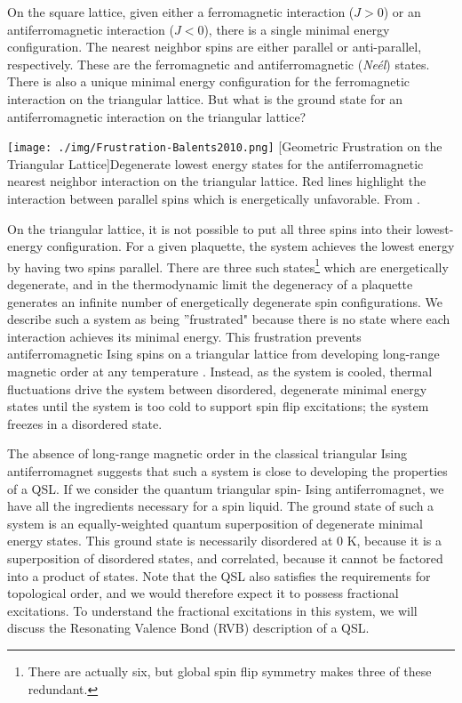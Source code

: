 On the square lattice, given either a ferromagnetic interaction ($J > 0$) or an antiferromagnetic interaction ($J < 0$), there is a single minimal energy configuration. The nearest neighbor spins are either parallel or anti-parallel, respectively. These are the ferromagnetic and antiferromagnetic (\textit{Ne{\'e}l}) states. There is also a unique minimal energy configuration for the ferromagnetic interaction on the triangular lattice. But what is the ground state for an antiferromagnetic interaction on the triangular lattice?

\begin{centering}
\texttt{[image: ./img/Frustration-Balents2010.png]}
  \captionsetup{width=0.75\textwidth}
  [Geometric Frustration on the Triangular Lattice]{Degenerate lowest energy states for the antiferromagnetic nearest neighbor interaction on the triangular lattice. Red lines highlight the interaction between parallel spins which is energetically unfavorable. From \cite{Balents2010}.}
  \label{fig:Frustration1}
\end{centering}

On the triangular lattice, it is not possible to put all three spins into their lowest-energy configuration. For a given plaquette, the system achieves the lowest energy by having two spins parallel. There are three such states\footnote{There are actually six, but global spin flip symmetry makes three of these redundant.} which are energetically degenerate, and in the thermodynamic limit the degeneracy of a plaquette generates an infinite number of energetically degenerate spin configurations. We describe such a system as being ''frustrated" because there is no state where each interaction achieves its minimal energy. This frustration prevents antiferromagnetic Ising spins on a triangular lattice from developing long-range magnetic order at any temperature \cite{Wannier1950}. Instead, as the system is cooled, thermal fluctuations drive the system between disordered, degenerate minimal energy states until the system is too cold to support spin flip excitations; the system freezes in a disordered state.

The absence of long-range magnetic order in the classical triangular Ising antiferromagnet suggests that such a system is close to developing the properties of a QSL. If we consider the quantum triangular spin-\textonehalf{} Ising antiferromagnet, we have all the ingredients necessary for a spin liquid. The ground state of such a system is an equally-weighted quantum superposition of degenerate minimal energy states. This ground state is necessarily disordered at 0 K, because it is a superposition of disordered states, and correlated, because it cannot be factored into a product of states. Note that the QSL also satisfies the requirements for topological order, and we would therefore expect it to possess fractional excitations. To understand the fractional excitations in this system, we will discuss the Resonating Valence Bond (RVB) description of a QSL.


